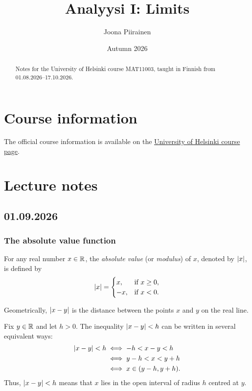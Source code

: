 \documentclass[12pt, a4paper]{article}
\title{Analyysi I: Limits}
\author{Joona Piirainen}
\date{Autumn 2026}
\begin{document}
\maketitle

\begin{abstract}
  Notes for the University of Helsinki course MAT11003, taught in Finnish
  from 01.08.2026--17.10.2026.
\end{abstract}

\tableofcontents

\section{Course information}

The official course information is available on the
\href{https://studies.helsinki.fi/kurssit/toteutus/hy-opt-cur-2627-0f6de353-53e0-4057-8e8e-b45cab4f2a8d}{University
of Helsinki course page}.

\section{Lecture notes}

\subsection{01.09.2026}

\subsubsection{The absolute value function}

\begin{definition}\label{def:abs}
  For any real number \(x \in \mathbb{R}\), the \emph{absolute value} (or
  \emph{modulus}) of \(x\), denoted by \(\lvert x\rvert\), is defined by
  \[
    \lvert x\rvert =
    \begin{cases}
      x,  & \text{if } x \geq 0, \\
      -x, & \text{if } x < 0.
    \end{cases}
  \]
\end{definition}

Geometrically, \(\lvert x-y\rvert\) is the distance between the points \(x\) and \(y\)
on the real line.

\begin{example}
  Fix \(y \in \mathbb{R}\) and let \(h>0\). The inequality \(\lvert x-y\rvert<h\) can be
  written in several equivalent ways:
  \begin{align*}
    \lvert x-y\rvert<h
    &\iff -h<x-y<h \\
    &\iff y-h<x<y+h \\
    &\iff x\in(y-h,y+h).
  \end{align*}
  Thus, \(\lvert x-y\rvert<h\) means that \(x\) lies in the open interval of radius
  \(h\) centred at \(y\).
\end{example}
\end{document}
